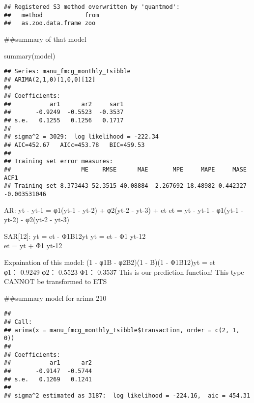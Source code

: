 \documentclass[
]{article}
\newenvironment{Shaded}{\begin{snugshade}}{\end{snugshade}}
\newcommand{\AttributeTok}[1]{\textcolor[rgb]{0.77,0.63,0.00}{#1}}
\newcommand{\CommentTok}[1]{\textcolor[rgb]{0.56,0.35,0.01}{\textit{#1}}}
\newcommand{\DecValTok}[1]{\textcolor[rgb]{0.00,0.00,0.81}{#1}}
\newcommand{\FunctionTok}[1]{\textcolor[rgb]{0.00,0.00,0.00}{#1}}
\newcommand{\NormalTok}[1]{#1}
\newcommand{\OtherTok}[1]{\textcolor[rgb]{0.56,0.35,0.01}{#1}}
\newcommand{\SpecialCharTok}[1]{\textcolor[rgb]{0.00,0.00,0.00}{#1}}
\begin{document}
\begin{verbatim}
## Registered S3 method overwritten by 'quantmod':
##   method            from
##   as.zoo.data.frame zoo
\end{verbatim}

\#\#summary of that model

\begin{Shaded}
\begin{Highlighting}[]
\FunctionTok{summary}\NormalTok{(model)}
\end{Highlighting}
\end{Shaded}

\begin{verbatim}
## Series: manu_fmcg_monthly_tsibble 
## ARIMA(2,1,0)(1,0,0)[12] 
## 
## Coefficients:
##           ar1      ar2     sar1
##       -0.9249  -0.5523  -0.3537
## s.e.   0.1255   0.1256   0.1717
## 
## sigma^2 = 3029:  log likelihood = -222.34
## AIC=452.67   AICc=453.78   BIC=459.53
## 
## Training set error measures:
##                    ME    RMSE      MAE       MPE     MAPE     MASE         ACF1
## Training set 8.373443 52.3515 40.08884 -2.267692 18.48982 0.442327 -0.003531046
\end{verbatim}

AR: yt - yt-1 = φ1(yt-1 - yt-2) + φ2(yt-2 - yt-3) + et et = yt - yt-1 -
φ1(yt-1 - yt-2) - φ2(yt-2 - yt-3)

SAR{[}12{]}: yt = et - Φ1B12yt yt = et - Φ1 yt-12\\
et = yt + Φ1 yt-12

Expaination of this model: (1 - φ1B - φ2B2)(1 - B)(1 - Φ1B12)yt = et
φ1：-0.9249 φ2：-0.5523 Φ1：-0.3537 This is our prediction function!
This type CANNOT be transformed to ETS

\#\#summary model for arima 210

\begin{Shaded}
\end{Shaded}

\begin{verbatim}
## 
## Call:
## arima(x = manu_fmcg_monthly_tsibble$transaction, order = c(2, 1, 0))
## 
## Coefficients:
##           ar1      ar2
##       -0.9147  -0.5744
## s.e.   0.1269   0.1241
## 
## sigma^2 estimated as 3187:  log likelihood = -224.16,  aic = 454.31
\end{verbatim}
\end{document}
